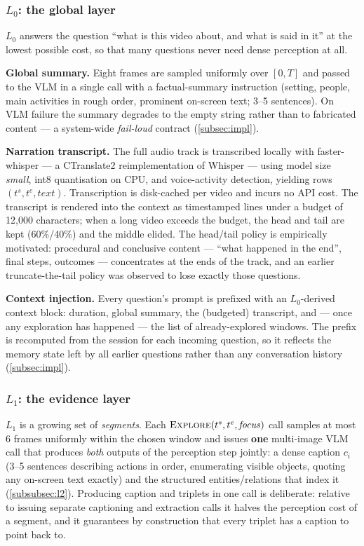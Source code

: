 \subsubsection{$L_0$: the global layer}
\label{subsubsec:l0}

$L_0$ answers the question ``what is this video about, and what is said in it'' at the lowest
possible cost, so that many questions never need dense perception at all.

\textbf{Global summary.} Eight frames are sampled uniformly over $[0, T]$ and passed to the VLM in a
single call with a factual-summary instruction (setting, people, main activities in rough order,
prominent on-screen text; 3--5 sentences). On VLM failure the summary degrades to the empty string
rather than to fabricated content --- a system-wide \emph{fail-loud} contract (\cref{subsec:impl}).

\textbf{Narration transcript.} The full audio track is transcribed locally with faster-whisper --- a
CTranslate2 reimplementation of Whisper \cite{radford2023whisper} --- using model size \emph{small}, int8
quantisation on CPU, and voice-activity detection, yielding rows
$(t^{s}, t^{e}, \mathit{text})$. Transcription is disk-cached per video and incurs no API cost.
The transcript is rendered into the context as timestamped lines under a budget of 12,000
characters; when a long video exceeds the budget, the head and tail are kept (60\%/40\%) and the
middle elided. The head/tail policy is empirically motivated: procedural and conclusive content ---
``what happened in the end'', final steps, outcomes --- concentrates at the ends of the track, and an
earlier truncate-the-tail policy was observed to lose exactly those questions.

\textbf{Context injection.} Every question's prompt is prefixed with an $L_0$-derived context block:
duration, global summary, the (budgeted) transcript, and --- once any exploration has happened ---
the list of already-explored windows. The prefix is recomputed from the session for each incoming
question, so it reflects the memory state left by all earlier questions rather than any
conversation history (\cref{subsec:impl}).

\subsubsection{$L_1$: the evidence layer}
\label{subsubsec:l1}

$L_1$ is a growing set of \emph{segments}. Each $\textsc{Explore}(t^{s}, t^{e}, \mathit{focus})$ call
samples at most 6 frames uniformly within the chosen window and issues \textbf{one} multi-image VLM
call that produces \emph{both} outputs of the perception step jointly: a dense caption $c_i$ (3--5
sentences describing actions in order, enumerating visible objects, quoting any on-screen text
exactly) and the structured entities/relations that index it (\cref{subsubsec:l2}). Producing caption and
triplets in one call is deliberate: relative to issuing separate captioning and extraction calls
it halves the perception cost of a segment, and it guarantees by construction that every triplet
has a caption to point back to.

